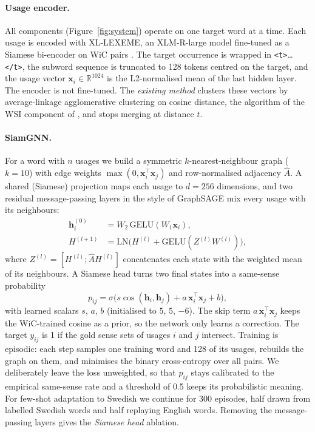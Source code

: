 \documentclass[11pt]{article}
\newcommand{\sys}{SiamGNN\xspace}
\newcommand{\xll}{XL-LEXEME\xspace}
\begin{document}
\paragraph{Usage encoder.}
All components (Figure~\ref{fig:system}) operate on one target word at a time. Each usage is encoded with \xll \citep{cassotti2023xllexeme}, an XLM-R-large model \citep{conneau2020unsupervised} fine-tuned as a Siamese bi-encoder \citep{reimers2019sentence} on WiC pairs \citep{pilehvar2019wic}. The target occurrence is wrapped in \texttt{<t>}\dots\texttt{</t>}, the subword sequence is truncated to 128 tokens centred on the target, and the usage vector $\mathbf{x}_i\in\mathbb{R}^{1024}$ is the L2-normalised mean of the last hidden layer. The encoder is not fine-tuned. The \emph{existing method} clusters these vectors by average-linkage agglomerative clustering on cosine distance, the algorithm of the WSI component of \citet{kokosinskii2024deepchange}, and stops merging at distance $t$.

\paragraph{\sys.}
For a word with $n$ usages we build a symmetric $k$-nearest-neighbour graph ($k=10$) with edge weights $\max(0,\mathbf{x}_i^{\top}\mathbf{x}_j)$ and row-normalised adjacency $\hat{A}$. A shared (Siamese) projection maps each usage to $d=256$ dimensions, and two residual message-passing layers in the style of GraphSAGE \citep{hamilton2017inductive} mix every usage with its neighbours:
\begin{align}
\mathbf{h}^{(0)}_i &= W_2\,\mathrm{GELU}(W_1\mathbf{x}_i),\\
H^{(l+1)} &= \mathrm{LN}\big(H^{(l)} + \mathrm{GELU}(Z^{(l)}W^{(l)})\big),
\end{align}
where $Z^{(l)}=[H^{(l)};\hat{A}H^{(l)}]$ concatenates each state with the weighted mean of its neighbours. A Siamese head turns two final states into a same-sense probability
\begin{equation}
p_{ij}=\sigma\big(s\cos(\mathbf{h}_i,\mathbf{h}_j)+a\,\mathbf{x}_i^{\top}\mathbf{x}_j+b\big),
\end{equation}
with learned scalars $s$, $a$, $b$ (initialised to $5$, $5$, $-6$). The skip term $a\,\mathbf{x}_i^{\top}\mathbf{x}_j$ keeps the WiC-trained cosine as a prior, so the network only learns a correction. The target $y_{ij}$ is 1 if the gold sense sets of usages $i$ and $j$ intersect. Training is episodic: each step samples one training word and 128 of its usages, rebuilds the graph on them, and minimises the binary cross-entropy over all pairs. We deliberately leave the loss unweighted, so that $p_{ij}$ stays calibrated to the empirical same-sense rate and a threshold of 0.5 keeps its probabilistic meaning. For few-shot adaptation to Swedish we continue for 300 episodes, half drawn from labelled Swedish words and half replaying English words. Removing the message-passing layers gives the \emph{Siamese head} ablation.
\end{document}
